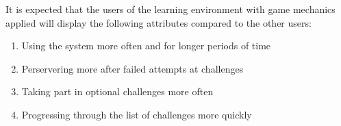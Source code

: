 It is expected that the users of the learning environment with game mechanics applied
will display the following attributes compared to the other users:
\begin{enumerate}
	\item Using the system more often and for longer periods of time
	\item Perservering more after failed attempts at challenges
	\item Taking part in optional challenges more often
	\item Progressing through the list of challenges more quickly
\end{enumerate}
